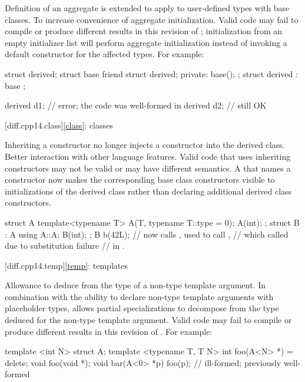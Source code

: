 \change
Definition of an aggregate is extended
to apply to user-defined types with base classes.
\rationale
To increase convenience of aggregate initialization.
\effect
Valid \CppXIV{} code may fail to compile or produce different results in this
revision of \Cpp{}; initialization from an empty initializer list will
perform aggregate initialization instead of invoking a default constructor
for the affected types.
For example:
\begin{codeblock}
struct derived;
struct base {
  friend struct derived;
private:
  base();
};
struct derived : base {};

derived d1{};       // error; the code was well-formed in \CppXIV{}
derived d2;         // still OK
\end{codeblock}

[diff.cpp14.class]{\ref{class}: classes}

\change
Inheriting a constructor no longer injects a constructor into the derived class.
\rationale
Better interaction with other language features.
\effect
Valid \CppXIV{} code that uses inheriting constructors may not be valid
or may have different semantics. A 
that names a constructor now makes the corresponding base class constructors
visible to initializations of the derived class
rather than declaring additional derived class constructors.
\begin{codeblock}
struct A {
  template<typename T> A(T, typename T::type = 0);
  A(int);
};
struct B : A {
  using A::A;
  B(int);
};
B b(42L);           // now calls , used to call ,
                    // which called  due to substitution failure
                    // in .
\end{codeblock}

[diff.cpp14.temp]{\ref{temp}: templates}

\change
Allowance to deduce from the type of a non-type template argument.
\rationale
In combination with the ability to declare
non-type template arguments with placeholder types,
allows partial specializations to decompose
from the type deduced for the non-type template argument.
\effect
Valid \CppXIV{} code may fail to compile
or produce different results in this revision of \Cpp{}.
For example:
\begin{codeblock}
template <int N> struct A;
template <typename T, T N> int foo(A<N> *) = delete;
void foo(void *);
void bar(A<0> *p) {
  foo(p);           // ill-formed; previously well-formed
}
\end{codeblock}

